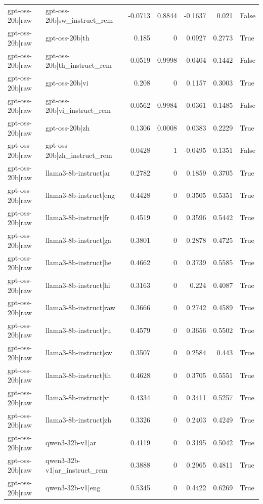 \begin{table}
\begin{tabular}{l l r r r r l}
gpt-oss-20b|raw & gpt-oss-20b|sw_instruct_rem & -0.0713 & 0.8844 & -0.1637 & 0.021 & False \\
gpt-oss-20b|raw & gpt-oss-20b|th & 0.185 & 0 & 0.0927 & 0.2773 & True \\
gpt-oss-20b|raw & gpt-oss-20b|th_instruct_rem & 0.0519 & 0.9998 & -0.0404 & 0.1442 & False \\
gpt-oss-20b|raw & gpt-oss-20b|vi & 0.208 & 0 & 0.1157 & 0.3003 & True \\
gpt-oss-20b|raw & gpt-oss-20b|vi_instruct_rem & 0.0562 & 0.9984 & -0.0361 & 0.1485 & False \\
gpt-oss-20b|raw & gpt-oss-20b|zh & 0.1306 & 0.0008 & 0.0383 & 0.2229 & True \\
gpt-oss-20b|raw & gpt-oss-20b|zh_instruct_rem & 0.0428 & 1 & -0.0495 & 0.1351 & False \\
gpt-oss-20b|raw & llama3-8b-instruct|ar & 0.2782 & 0 & 0.1859 & 0.3705 & True \\
gpt-oss-20b|raw & llama3-8b-instruct|eng & 0.4428 & 0 & 0.3505 & 0.5351 & True \\
gpt-oss-20b|raw & llama3-8b-instruct|fr & 0.4519 & 0 & 0.3596 & 0.5442 & True \\
gpt-oss-20b|raw & llama3-8b-instruct|ga & 0.3801 & 0 & 0.2878 & 0.4725 & True \\
gpt-oss-20b|raw & llama3-8b-instruct|he & 0.4662 & 0 & 0.3739 & 0.5585 & True \\
gpt-oss-20b|raw & llama3-8b-instruct|hi & 0.3163 & 0 & 0.224 & 0.4087 & True \\
gpt-oss-20b|raw & llama3-8b-instruct|raw & 0.3666 & 0 & 0.2742 & 0.4589 & True \\
gpt-oss-20b|raw & llama3-8b-instruct|ru & 0.4579 & 0 & 0.3656 & 0.5502 & True \\
gpt-oss-20b|raw & llama3-8b-instruct|sw & 0.3507 & 0 & 0.2584 & 0.443 & True \\
gpt-oss-20b|raw & llama3-8b-instruct|th & 0.4628 & 0 & 0.3705 & 0.5551 & True \\
gpt-oss-20b|raw & llama3-8b-instruct|vi & 0.4334 & 0 & 0.3411 & 0.5257 & True \\
gpt-oss-20b|raw & llama3-8b-instruct|zh & 0.3326 & 0 & 0.2403 & 0.4249 & True \\
gpt-oss-20b|raw & qwen3-32b-v1|ar & 0.4119 & 0 & 0.3195 & 0.5042 & True \\
gpt-oss-20b|raw & qwen3-32b-v1|ar_instruct_rem & 0.3888 & 0 & 0.2965 & 0.4811 & True \\
gpt-oss-20b|raw & qwen3-32b-v1|eng & 0.5345 & 0 & 0.4422 & 0.6269 & True \\

\end{tabular}
\end{table}
